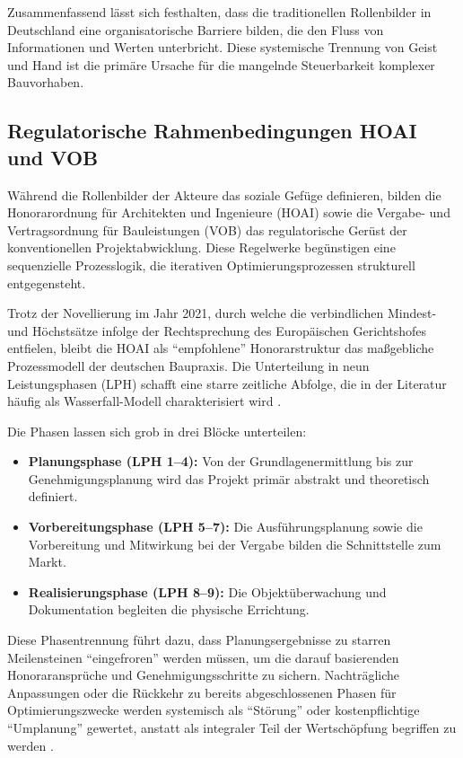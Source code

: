 Zusammenfassend lässt sich festhalten, dass die traditionellen Rollenbilder in Deutschland eine organisatorische Barriere bilden, die den Fluss von Informationen und Werten unterbricht. Diese systemische Trennung von Geist und Hand ist die primäre Ursache für die mangelnde Steuerbarkeit komplexer Bauvorhaben.

\subsection{Regulatorische Rahmenbedingungen HOAI und VOB}
\label{sec:2.1.2}

Während die Rollenbilder der Akteure das soziale Gefüge definieren, bilden die Honorarordnung für Architekten und Ingenieure (\acs{HOAI}) sowie die Vergabe- und Vertragsordnung für Bauleistungen (\acs{VOB}) das regulatorische Gerüst der konventionellen Projektabwicklung. Diese Regelwerke begünstigen eine sequenzielle Prozesslogik, die iterativen Optimierungsprozessen strukturell entgegensteht.

Trotz der Novellierung im Jahr 2021, durch welche die verbindlichen Mindest- und Höchstsätze infolge der Rechtsprechung des Europäischen Gerichtshofes entfielen, bleibt die \acs{HOAI} als \enquote{empfohlene} Honorarstruktur das maßgebliche Prozessmodell der deutschen Baupraxis. Die Unterteilung in neun Leistungsphasen (\acs{LPH}) schafft eine starre zeitliche Abfolge, die in der Literatur häufig als Wasserfall-Modell charakterisiert wird \autocite[Vgl.][S.~435 f]{girmscheid_projektabwicklung_2016}.

Die Phasen lassen sich grob in drei Blöcke unterteilen:
\begin{itemize}
    \item \textbf{Planungsphase (\acs{LPH} 1--4):} Von der Grundlagenermittlung bis zur Genehmigungsplanung wird das Projekt primär abstrakt und theoretisch definiert.
    \item \textbf{Vorbereitungsphase (\acs{LPH} 5--7):} Die Ausführungsplanung sowie die Vorbereitung und Mitwirkung bei der Vergabe bilden die Schnittstelle zum Markt.
    \item \textbf{Realisierungsphase (\acs{LPH} 8--9):} Die Objektüberwachung und Dokumentation begleiten die physische Errichtung.
\end{itemize}

Diese Phasentrennung führt dazu, dass Planungsergebnisse zu starren Meilensteinen \enquote{eingefroren} werden müssen, um die darauf basierenden Honoraransprüche und Genehmigungsschritte zu sichern. Nachträgliche Anpassungen oder die Rückkehr zu bereits abgeschlossenen Phasen für Optimierungszwecke werden systemisch als \enquote{Störung} oder kostenpflichtige \enquote{Umplanung} gewertet, anstatt als integraler Teil der Wertschöpfung begriffen zu werden \autocite[Vgl.][§~34 i.\,V.\,m.~Anl.~10]{hoai_honorarordnung_2021}.

